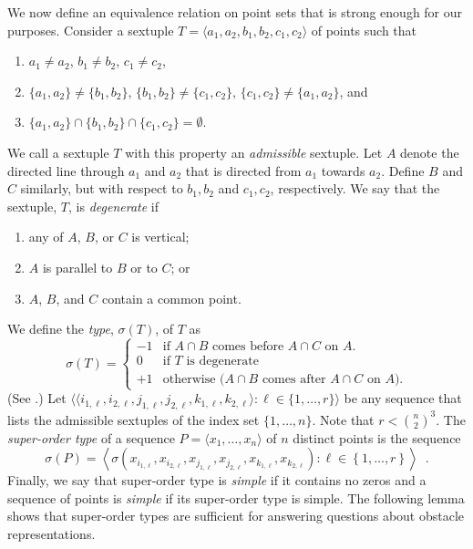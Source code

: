 \documentclass{patmorin}
\begin{document}
We now define an equivalence relation on point sets that is
strong enough for our purposes.  Consider a sextuple $T=\langle
a_1,a_2,b_1,b_2,c_1,c_2\rangle$ of points such that
\begin{enumerate}
  \item  $a_1\neq a_2$, $b_1\neq b_2$, $c_1\neq c_2$, 
  \item  $\{a_1,a_2\}\neq \{b_1,b_2\}$, 
$\{b_1,b_2\}\neq \{c_1,c_2\}$, $\{c_1,c_2\}\neq \{a_1,a_2\}$, and 
  \item $\{a_1,a_2\}\cap\{b_1,b_2\}\cap\{c_1,c_2\}=\emptyset$.
\end{enumerate}
We call a sextuple $T$ with this property an \emph{admissible} sextuple.
Let $A$ denote the directed line through $a_1$ and $a_2$ that is directed
from $a_1$ towards $a_2$. Define $B$ and $C$ similarly, but with respect
to $b_1,b_2$ and $c_1,c_2$, respectively.  We say that the sextuple,
$T$, is \emph{degenerate} if
\begin{enumerate}
  \item any of $A$, $B$, or $C$ is vertical;
  \item $A$ is parallel to $B$ or to $C$; or
  \item $A$, $B$, and $C$ contain a common point.
\end{enumerate}
We define the \emph{type}, $\sigma(T)$, of $T$ as
\[
    \sigma(T) = \left\{\begin{array}{rl}
      -1 & \text{if $A\cap B$ comes before $A\cap C$ on $A$.} \\
      0 & \text{if $T$ is degenerate} \\
      +1 & \text{otherwise ($A\cap B$ comes after $A\cap C$ on $A$).} 
    \end{array}\right.
\]
(See .)  Let $\langle\langle
i_{1,\ell},i_{2,\ell},j_{1,\ell},j_{2,\ell},k_{1,\ell},k_{2,\ell}\rangle:
\ell \in \{1,\ldots,r\}\rangle$ be any sequence that lists the
admissible sextuples of the index set $\{1,\ldots,n\}$.  Note that $r<
\binom{n}{2}^3$.  The \emph{super-order type} of a sequence $P=\langle
x_1,\ldots,x_n\rangle$ of $n$ distinct points is the sequence
\[
   \sigma(P) = \left\langle \sigma\left(x_{i_{1,\ell}},x_{i_{2,\ell}},
       x_{j_{1,\ell}},x_{j_{2,\ell}},
       x_{k_{1,\ell}},x_{k_{2,\ell}}\right) : \ell\in\left\{1,\ldots,r\right\} \right\rangle \enspace .
\]
Finally, we say that super-order type is \emph{simple} if it contains
no zeros and a sequence of points is \emph{simple} if its super-order
type is simple.  The following lemma shows that super-order types are
sufficient for answering questions about obstacle representations.
\end{document}
